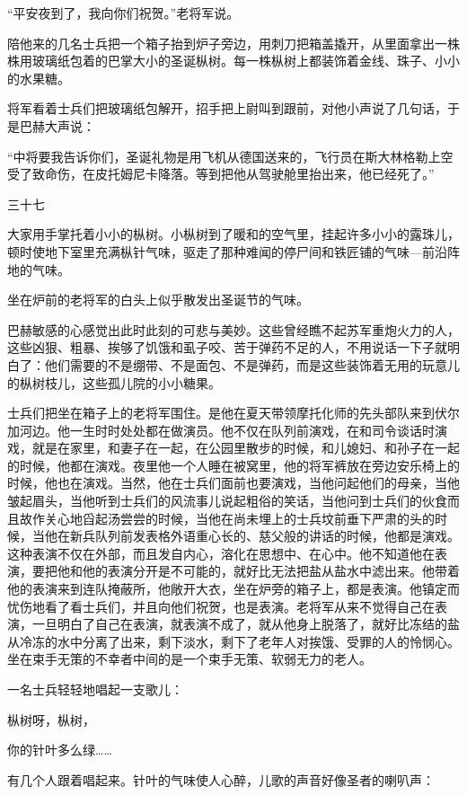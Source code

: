 “平安夜到了，我向你们祝贺。”老将军说。

陪他来的几名士兵把一个箱子抬到炉子旁边，用刺刀把箱盖撬开，从里面拿出一株株用玻璃纸包着的巴掌大小的圣诞枞树。每一株枞树上都装饰着金线、珠子、小小的水果糖。

将军看着士兵们把玻璃纸包解开，招手把上尉叫到跟前，对他小声说了几句话，于是巴赫大声说：

“中将要我告诉你们，圣诞礼物是用飞机从德国送来的，飞行员在斯大林格勒上空受了致命伤，在皮托姆尼卡降落。等到把他从驾驶舱里抬出来，他已经死了。”

三十七

大家用手掌托着小小的枞树。小枞树到了暖和的空气里，挂起许多小小的露珠儿，顿时使地下室里充满枞针气味，驱走了那种难闻的停尸间和铁匠铺的气味—前沿阵地的气味。

坐在炉前的老将军的白头上似乎散发出圣诞节的气味。

巴赫敏感的心感觉出此时此刻的可悲与美妙。这些曾经瞧不起苏军重炮火力的人，这些凶狠、粗暴、挨够了饥饿和虱子咬、苦于弹药不足的人，不用说话一下子就明白了：他们需要的不是绷带、不是面包、不是弹药，而是这些装饰着无用的玩意儿的枞树枝儿，这些孤儿院的小小糖果。

士兵们把坐在箱子上的老将军围住。是他在夏天带领摩托化师的先头部队来到伏尔加河边。他一生时时处处都在做演员。他不仅在队列前演戏，在和司令谈话时演戏，就是在家里，和妻子在一起，在公园里散步的时候，和儿媳妇、和孙子在一起的时候，他都在演戏。夜里他一个人睡在被窝里，他的将军裤放在旁边安乐椅上的时候，他也在演戏。当然，他在士兵们面前也要演戏，当他问起他们的母亲，当他皱起眉头，当他听到士兵们的风流事儿说起粗俗的笑话，当他问到士兵们的伙食而且故作关心地舀起汤尝尝的时候，当他在尚未埋上的士兵坟前垂下严肃的头的时候，当他在新兵队列前发表格外语重心长的、慈父般的讲话的时候，他都是演戏。这种表演不仅在外部，而且发自内心，溶化在思想中、在心中。他不知道他在表演，要把他和他的表演分开是不可能的，就好比无法把盐从盐水中滤出来。他带着他的表演来到连队掩蔽所，他敞开大衣，坐在炉旁的箱子上，都是表演。他镇定而忧伤地看了看士兵们，并且向他们祝贺，也是表演。老将军从来不觉得自己在表演，一旦明白了自己在表演，就表演不成了，就从他身上脱落了，就好比冻结的盐从冷冻的水中分离了出来，剩下淡水，剩下了老年人对挨饿、受罪的人的怜悯心。坐在束手无策的不幸者中间的是一个束手无策、软弱无力的老人。

一名士兵轻轻地唱起一支歌儿：

枞树呀，枞树，

你的针叶多么绿……

有几个人跟着唱起来。针叶的气味使人心醉，儿歌的声音好像圣者的喇叭声：

